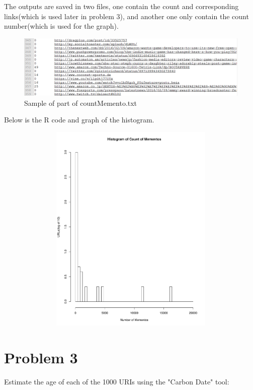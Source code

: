 \documentclass[12pt]{article}
\begin{document}


The outputs are saved in two files, one contain the count and corresponding links(which is used later in problem 3), and another one only contain the count number(which is used for the graph).

\begin{figure}[h]
\centering
\includegraphics[width=6.5in]{countMomento.png}
\caption{Sample of part of countMemento.txt}
\end{figure}

Below is the R code and graph of the histogram.



\newpage

\begin{figure}[h]
\centering
 \includegraphics[page=1,
    width=4.5in,
    height=4in]{HistogramofCountofMementos.pdf}
\end{figure}

\section*{Problem 3}
Estimate the age of each of the 1000 URIs using the "Carbon Date" tool:
\end{document}
